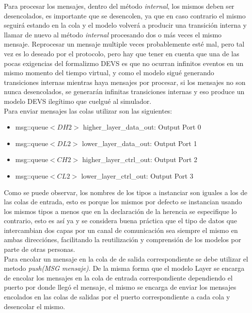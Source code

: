 \documentclass[10pt,a4paper]{article}
\begin{document}
Para procesar los mensajes, dentro del método \textit{internal}, los mismos deben ser desencolados, es importante que se desencolen, ya que en caso contrario el mismo seguirá estando en la cola y el modelo volverá a producir una transición interna y llamar de nuevo al método \textit{internal} procesando dos o más veces el mismo mensaje. Reprocesar un mensaje multiple veces probablemente esté mal, pero tal vez es lo deseado por el protocolo, pero hay que tener en cuenta que una de las pocas exigencias del formalizmo DEVS es que no ocurran infinitos eventos en un mismo momento del tiempo virtual, y como el modelo sigué generando transiciones internas mientras haya mensajes por procesar, si los mensajes no son nunca desencolados, se generarán infinitas transiciones internas y eso produce un modelo DEVS ilegítimo que cuelgué al simulador. \\

Para enviar mensajes las colas utilizar son las siguientes:
\begin{itemize}
\item msg::queue$<DH2>$ higher\_layer\_data\_out: Output Port 0 
\item msg::queue$<DL2>$ lower\_layer\_data\_out:  Output Port 1
\item msg::queue$<CH2>$ higher\_layer\_ctrl\_out: Output Port 2
\item msg::queue$<CL2>$ lower\_layer\_ctrl\_out:  Output Port 3
\end{itemize}

Como se puede observar, los nombres de los tipos a instanciar son iguales a los de las colas de entrada, esto es porque los mismos por defecto se instancian usando los mismos tipos a menos que en la declaración de la herencia se especifique lo contrario, esto es así ya y se considera buena práctica que el tipo de datos que intercambian dos capas por un canal de comunicación sea siempre el mismo en ambas direcciónes, facilitando la reutilización y comprensión de los modelos por parte de otras personas. \\

Para encolar un mensaje en la cola de de salida correspondiente se debe utilizar el metodo \textit{push(MSG mensaje)}. De la misma forma que el modelo Layer se encarga de encolar los mensajes en la cola de entrada correspondiente dependiendo el puerto por donde llegó el mensaje, el mismo se encarga de enviar los mensajes encolados en las colas de salidas por el puerto correspondiente a cada cola y desencolar el mismo. \\
\end{document}
